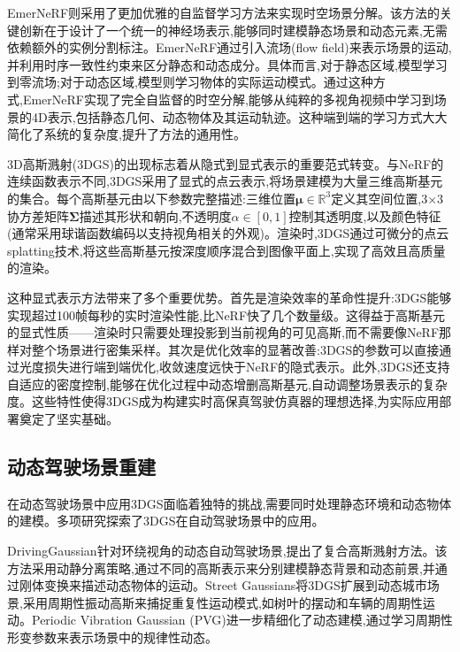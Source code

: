 EmerNeRF\cite{emernerf2023,yang2023emernerf}则采用了更加优雅的自监督学习方法来实现时空场景分解。该方法的关键创新在于设计了一个统一的神经场表示,能够同时建模静态场景和动态元素,无需依赖额外的实例分割标注。EmerNeRF通过引入流场(flow field)来表示场景的运动,并利用时序一致性约束来区分静态和动态成分。具体而言,对于静态区域,模型学习到零流场;对于动态区域,模型则学习物体的实际运动模式。通过这种方式,EmerNeRF实现了完全自监督的时空分解,能够从纯粹的多视角视频中学习到场景的4D表示,包括静态几何、动态物体及其运动轨迹。这种端到端的学习方式大大简化了系统的复杂度,提升了方法的通用性。

3D高斯溅射(3DGS)的出现标志着从隐式到显式表示的重要范式转变\cite{kerbl2023gaussian,kerbl20233dgs}。与NeRF的连续函数表示不同,3DGS采用了显式的点云表示,将场景建模为大量三维高斯基元的集合。每个高斯基元由以下参数完整描述:三维位置$\boldsymbol{\mu} \in \mathbb{R}^3$定义其空间位置,3×3协方差矩阵$\boldsymbol{\Sigma}$描述其形状和朝向,不透明度$\alpha \in [0,1]$控制其透明度,以及颜色特征(通常采用球谐函数编码以支持视角相关的外观)。渲染时,3DGS通过可微分的点云splatting技术,将这些高斯基元按深度顺序混合到图像平面上,实现了高效且高质量的渲染。

这种显式表示方法带来了多个重要优势。首先是渲染效率的革命性提升:3DGS能够实现超过100帧每秒的实时渲染性能,比NeRF快了几个数量级。这得益于高斯基元的显式性质——渲染时只需要处理投影到当前视角的可见高斯,而不需要像NeRF那样对整个场景进行密集采样。其次是优化效率的显著改善:3DGS的参数可以直接通过光度损失进行端到端优化,收敛速度远快于NeRF的隐式表示。此外,3DGS还支持自适应的密度控制,能够在优化过程中动态增删高斯基元,自动调整场景表示的复杂度。这些特性使得3DGS成为构建实时高保真驾驶仿真器的理想选择,为实际应用部署奠定了坚实基础。

\subsection{动态驾驶场景重建}

在动态驾驶场景中应用3DGS面临着独特的挑战,需要同时处理静态环境和动态物体的建模。多项研究\cite{zhou2024drivinggaussian,yan2024street,yan2024streetgaussians,chen2023pvg,chen2023pvg_arxiv}探索了3DGS在自动驾驶场景中的应用。

DrivingGaussian\cite{zhou2024drivinggaussian}针对环绕视角的动态自动驾驶场景,提出了复合高斯溅射方法。该方法采用动静分离策略,通过不同的高斯表示来分别建模静态背景和动态前景,并通过刚体变换来描述动态物体的运动。Street Gaussians将3DGS扩展到动态城市场景,采用周期性振动高斯来捕捉重复性运动模式,如树叶的摆动和车辆的周期性运动\cite{yan2024street,yan2024streetgaussians}。Periodic Vibration Gaussian (PVG)\cite{chen2023pvg,chen2023pvg_arxiv}进一步精细化了动态建模,通过学习周期性形变参数来表示场景中的规律性动态。

